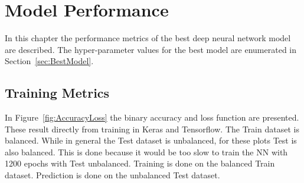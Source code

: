\chapter{Model Performance}
\label{chapter:ModelPerformance}

In this chapter the performance metrics of the best deep neural network model are described. The hyper-parameter values for the best model are enumerated in Section~\ref{sec:BestModel}.

\section{Training Metrics}
\label{sec:Training}

In Figure~\ref{fig:AccuracyLoss} the binary accuracy and loss function are presented. These result directly from training in Keras and Tensorflow. The Train dataset is balanced. While in general the Test dataset is unbalanced, for these plots Test is also balanced. This is done because it would be too slow to train the NN with 1200 epochs with Test unbalanced. Training is done on the balanced Train dataset. Prediction is done on the unbalanced Test dataset.


